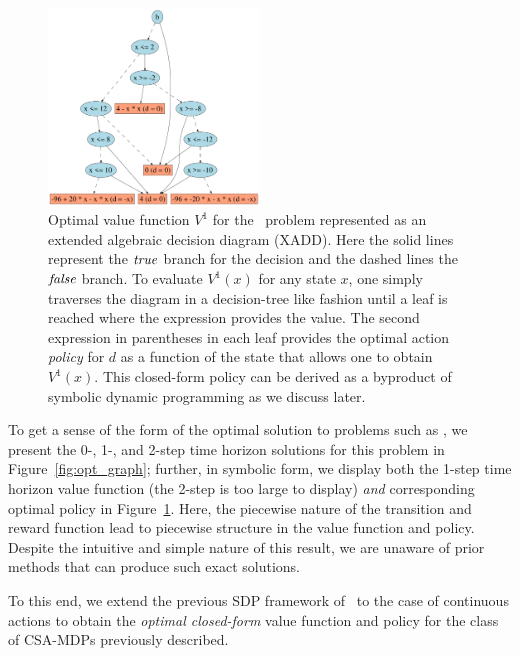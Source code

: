\begin{figure}[t!]
\centering
\includegraphics[width=0.5\textwidth]{Figures1/v2_mr_dd.pdf}
\caption{\footnotesize Optimal value function $V^1$ for the
\MarsRover\ problem represented as an extended algebraic decision
diagram (XADD).  Here the solid lines represent the $\mathit{true}$ branch for
the decision and the dashed lines the $\mathit{false}$ branch.  To evaluate
$V^1(x)$ for any state $x$, one simply traverses the diagram in a
decision-tree like fashion until a leaf is reached where the
expression provides the value.  The second expression in parentheses
in each leaf provides the optimal action \emph{policy} for $d$ as a
function of the state that allows one to obtain $V^1(x)$.  This
closed-form policy can be derived as a byproduct of symbolic dynamic
programming as we discuss later.}
\label{fig:opt_val_pol}
\end{figure}

To get a sense of the form of the optimal solution to problems such as
\MarsRover, we present the 0-, 1-, and 2-step time horizon solutions
for this problem in Figure~\ref{fig:opt_graph}; further, in symbolic
form, we display both the 1-step time horizon value function (the
2-step is too large to display) \emph{and} corresponding optimal
policy in Figure~\ref{fig:opt_val_pol}.  Here, the piecewise nature of
the transition and reward function lead to piecewise
structure in the value function and policy.  Despite the intuitive and
simple nature of this result, we are unaware of prior methods that can
produce such exact solutions.

To this end, we extend the previous SDP framework
of~\cite{sanner_uai11} to the case of continuous actions to obtain the
\emph{optimal closed-form} value function and policy for the
class of CSA-MDPs previously described.

